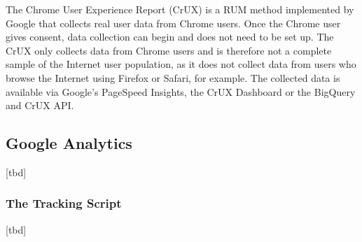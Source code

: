 The Chrome User Experience Report (CrUX) is a RUM method implemented by Google that collects real user data from Chrome users.
Once the Chrome user gives consent, data collection can begin and does not need to be set up.
The CrUX only collects data from Chrome users and is therefore not a complete sample of the Internet user population, as it does not collect data from users who browse the Internet using Firefox or Safari, for example.
The collected data is available via Google's PageSpeed Insights, the CrUX Dashboard or the BigQuery and CrUX API. %





\subsection{Google Analytics}

[tbd]





\subsubsection{The Tracking Script}

[tbd]








